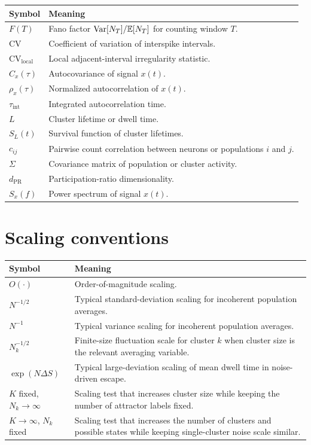 \begin{tabularx}{\textwidth}{@{}p{}X@{}}
\toprule
\textbf{Symbol} & \textbf{Meaning} \\
\midrule
$F(T)$ & Fano factor $\operatorname{Var}[N_T]/\mathbb{E}[N_T]$ for counting window $T$. \\
$\mathrm{CV}$ & Coefficient of variation of interspike intervals. \\
$\mathrm{CV}_{\mathrm{local}}$ & Local adjacent-interval irregularity statistic. \\
$C_x(\tau)$ & Autocovariance of signal $x(t)$. \\
$\rho_x(\tau)$ & Normalized autocorrelation of $x(t)$. \\
$\tau_{\mathrm{int}}$ & Integrated autocorrelation time. \\
$L$ & Cluster lifetime or dwell time. \\
$S_L(t)$ & Survival function of cluster lifetimes. \\
$c_{ij}$ & Pairwise count correlation between neurons or populations $i$ and $j$. \\
$\Sigma$ & Covariance matrix of population or cluster activity. \\
$d_{\mathrm{PR}}$ & Participation-ratio dimensionality. \\
$S_x(f)$ & Power spectrum of signal $x(t)$. \\
\bottomrule
\end{tabularx}

\section{Scaling conventions}
\label{app:notation-scaling}

\begin{tabularx}{\textwidth}{@{}p{}X@{}}
\toprule
\textbf{Symbol} & \textbf{Meaning} \\
\midrule
$O(\cdot)$ & Order-of-magnitude scaling. \\
$N^{-1/2}$ & Typical standard-deviation scaling for incoherent population averages. \\
$N^{-1}$ & Typical variance scaling for incoherent population averages. \\
$N_k^{-1/2}$ & Finite-size fluctuation scale for cluster $k$ when cluster size is the relevant averaging variable. \\
$\exp(N\Delta S)$ & Typical large-deviation scaling of mean dwell time in noise-driven escape. \\
$K$ fixed, $N_k\to\infty$ & Scaling test that increases cluster size while keeping the number of attractor labels fixed. \\
$K\to\infty$, $N_k$ fixed & Scaling test that increases the number of clusters and possible states while keeping single-cluster noise scale similar. \\
\bottomrule
\end{tabularx}

\clearpage
